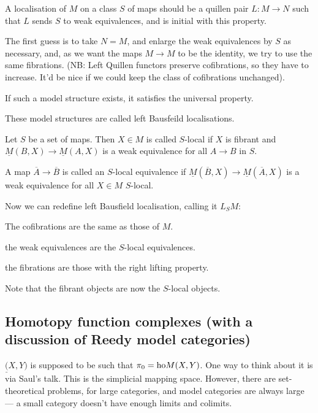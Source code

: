 \documentclass[11pt]{article}
\begin{document}
\begin{AlexandreBausfieldLocalisation}
\begin{PartOne}
\begin{defn*}
A localisation of $M$ on a class $S$ of maps should be a quillen pair $L:M\to N$ such that $L$ sends $S$ to weak equivalences, and is initial with this property.
\end{defn*}
The first guess is to take $N=M$, and enlarge the weak equivalences by $S$ as necessary,  and, as we want the maps $M\to M$ to be the identity, we try to use the same fibrations. (NB: Left Quillen functors preserve cofibrations, so they have to increase. It'd be nice if we could keep the class of cofibrations unchanged).
\begin{prop*}
If such a model structure exists, it satisfies the universal property.
\end{prop*}
\begin{defn*}
These model structures are called left Bausfeild localisations.
\end{defn*}
\begin{defn*}
Let $S$ be a set of maps. Then $X\in M$ is called $S$-local if $X$ is fibrant and $\underline M(B,X)\to\underline M(A,X)$ is a weak equivalence for all $A\to B$ in $S$.
\end{defn*}
\begin{defn*}
A map $\overline A\to\overline B$ is called an $S$-local equivalence if $\underline M(\overline B,X)\to\underline M(\overline A,X)$ is a weak equivalence for all $X\in M$ $S$-local.
\end{defn*}
Now we can redefine left Bausfield localisation, calling it $L_SM$:
\begin{itemise}
\item The cofibrations are the same as those of $M$.
\item the weak equivalences are the $S$-local equivalences.
\item the fibrations are those with the right lifting property.
\item Note that the fibrant objects are now the $S$-local objects.
\end{itemise}
\subsection*{Homotopy function complexes (with a discussion of Reedy model categories)}
$\underline(X,Y)$ is supposed to be such that $\pi_0=\textup{ho} M(X,Y)$. One way to think about it is via Saul's talk. This is the simplicial mapping space. However, there are set-theoretical problems, for large categories, and model categories are always large --- a small category doesn't have enough limits and colimits.


\end{PartOne}
\end{AlexandreBausfieldLocalisation}
\end{document}
